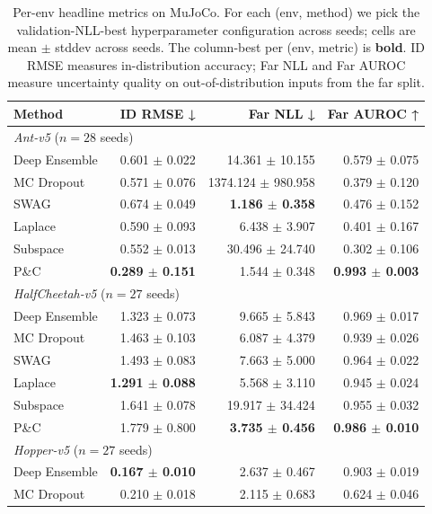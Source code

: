 \begin{table}[t]
  \centering
  \small
  \caption{Per-env headline metrics on MuJoCo. For each (env, method) we pick the validation-NLL-best hyperparameter configuration across seeds; cells are mean $\pm$ stddev across seeds. The column-best per (env, metric) is \textbf{bold}. ID RMSE measures in-distribution accuracy; Far NLL and Far AUROC measure uncertainty quality on out-of-distribution inputs from the far split.}
  \label{tab:appendix-per-env}
  \begin{tabular}{lrrr}
    \toprule
    Method & ID RMSE ↓ & Far NLL ↓ & Far AUROC ↑ \\
    \midrule
    \multicolumn{4}{l}{\textit{Ant-v5} ($n=28$ seeds)} \\
    Deep Ensemble & 0.601 $\pm$ 0.022 & 14.361 $\pm$ 10.155 & 0.579 $\pm$ 0.075 \\
    MC Dropout & 0.571 $\pm$ 0.076 & 1374.124 $\pm$ 980.958 & 0.379 $\pm$ 0.120 \\
    SWAG & 0.674 $\pm$ 0.049 & \textbf{1.186 $\pm$ 0.358} & 0.476 $\pm$ 0.152 \\
    Laplace & 0.590 $\pm$ 0.093 & 6.438 $\pm$ 3.907 & 0.401 $\pm$ 0.167 \\
    Subspace & 0.552 $\pm$ 0.013 & 30.496 $\pm$ 24.740 & 0.302 $\pm$ 0.106 \\
    P\&C & \textbf{0.289 $\pm$ 0.151} & 1.544 $\pm$ 0.348 & \textbf{0.993 $\pm$ 0.003} \\
    \midrule
    \multicolumn{4}{l}{\textit{HalfCheetah-v5} ($n=27$ seeds)} \\
    Deep Ensemble & 1.323 $\pm$ 0.073 & 9.665 $\pm$ 5.843 & 0.969 $\pm$ 0.017 \\
    MC Dropout & 1.463 $\pm$ 0.103 & 6.087 $\pm$ 4.379 & 0.939 $\pm$ 0.026 \\
    SWAG & 1.493 $\pm$ 0.083 & 7.663 $\pm$ 5.000 & 0.964 $\pm$ 0.022 \\
    Laplace & \textbf{1.291 $\pm$ 0.088} & 5.568 $\pm$ 3.110 & 0.945 $\pm$ 0.024 \\
    Subspace & 1.641 $\pm$ 0.078 & 19.917 $\pm$ 34.424 & 0.955 $\pm$ 0.032 \\
    P\&C & 1.779 $\pm$ 0.800 & \textbf{3.735 $\pm$ 0.456} & \textbf{0.986 $\pm$ 0.010} \\
    \midrule
    \multicolumn{4}{l}{\textit{Hopper-v5} ($n=27$ seeds)} \\
    Deep Ensemble & \textbf{0.167 $\pm$ 0.010} & 2.637 $\pm$ 0.467 & 0.903 $\pm$ 0.019 \\
    MC Dropout & 0.210 $\pm$ 0.018 & 2.115 $\pm$ 0.683 & 0.624 $\pm$ 0.046 \\

\end{tabular}
\end{table}
